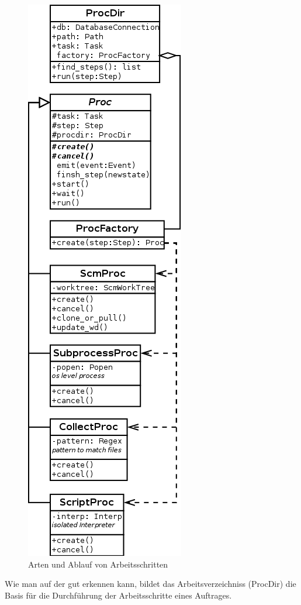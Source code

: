 \begin{figure}[!ht]
  \centering
  \includegraphics[height=0.8\textheight]{imageinput/klassen-arten-arbeitsschritt.png}
  \caption{Arten und Ablauf von Arbeitsschritten}
  \label{fig:klassen-arten-arbeitsschritt}
\end{figure}

Wie man auf der  gut erkennen kann,
bildet das Arbeitsverzeichniss (ProcDir) die Basis
für die Durchführung der Arbeitsschritte eines Auftrages.


